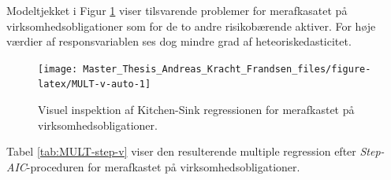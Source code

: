 \documentclass[
  a4paper,
  oneside]{memoir}
\begin{document}
Modeltjekket i Figur \ref{fig:MULT-v-auto} viser tilsvarende problemer for merafkasatet på virksomhedsobligationer som for de to andre risikobærende aktiver. For høje værdier af responsvariablen ses dog mindre grad af heteoriskedasticitet.

\begin{figure}[H]

{\centering \texttt{[image: Master\_Thesis\_Andreas\_Kracht\_Frandsen\_files/figure-latex/MULT-v-auto-1]} 

}

\caption{Visuel inspektion af Kitchen-Sink regressionen for merafkastet på virksomhedsobligationer.}\label{fig:MULT-v-auto}
\end{figure}

Tabel \ref{tab:MULT-step-v} viser den resulterende multiple regression efter \emph{Step-AIC}-proceduren for merafkastet på virksomhedsobligationer.
\end{document}
